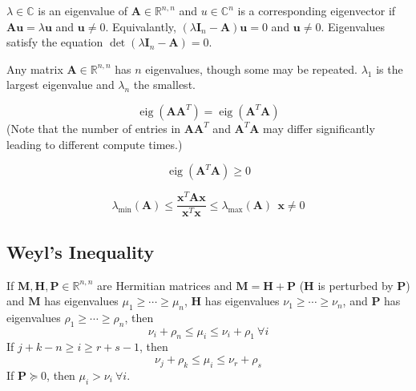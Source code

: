 \documentclass{book}
\newcommand{\mA}{\mathbf{A}}
\newcommand{\mH}{\mathbf{H}}
\newcommand{\mI}{\mathbf{I}}
\newcommand{\mM}{\mathbf{M}}
\newcommand{\mP}{\mathbf{P}}
\newcommand{\vu}{\mathbf{u}}
\newcommand{\vx}{\mathbf{x}}
\DeclareMathOperator{\eig}{eig}
\newcommand{\sRnn}{\mathbb{R}^{n,n}}
\newcommand{\ispsd}{\succeq}
\begin{document}
$\lambda\in\mathbb{C}$ is an eigenvalue of $\mA\in\sRnn$ and $u\in\mathbb{C}^n$ is a corresponding eigenvector if $\mA\vu=\lambda\vu$ and $\vu\ne0$. Equivalantly, $(\lambda \mI_n-\mA)\vu=0$ and $\vu\ne0$. Eigenvalues satisfy the equation $\det(\lambda\mI_n-\mA)=0$.

Any matrix $\mA\in\sRnn$ has $n$ eigenvalues, though some may be repeated. $\lambda_1$ is the largest eigenvalue and $\lambda_n$ the smallest.

\begin{equation}
\eig(\mA\mA^T)=\eig(\mA^T\mA)
\end{equation}
(Note that the number of entries in $\mA\mA^T$ and $\mA^T\mA$ may differ significantly leading to different compute times.)

\begin{equation}
\eig(\mA^T\mA)\ge0
\end{equation}

\begin{equation}
\lambda_\textrm{min}(\mA)\le \frac{\vx^T \mA \vx}{\vx^T\vx} \le \lambda_\textrm{max}(\mA)~~\vx\ne0
\end{equation}

\subsection{Weyl's Inequality}
If $\mM,\mH,\mP\in\sRnn$ are Hermitian matrices and $\mM=\mH+\mP$ ($\mH$ is perturbed by $\mP$) and $\mM$ has eigenvalues $\mu_1\ge\cdots\ge\mu_n$, $\mH$ has eigenvalues $\nu_1\ge\cdots\ge\nu_n$, and $\mP$ has eigenvalues $\rho_1\ge\cdots\ge\rho_n$, then
\begin{equation}
\nu_i+\rho_n\le \mu_i \le \nu_i + \rho_1~\forall i
\end{equation}
If $j+k-n\ge i \ge r+s-1$, then
\begin{equation}
\nu_j+\rho_k\le\mu_i\le\nu_r+\rho_s
\end{equation}
If $\mP\ispsd0$, then $\mu_i>\nu_i~\forall i$.









\end{document}
